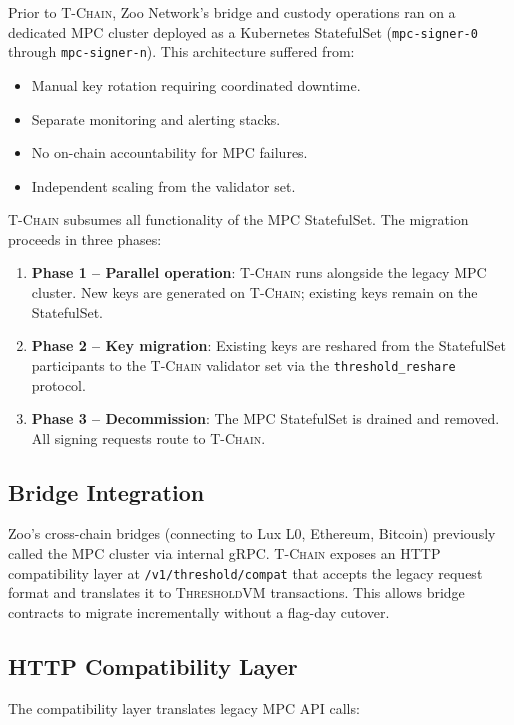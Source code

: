 \documentclass[11pt,letterpaper]{article}
\theoremstyle{definition}
\theoremstyle{remark}
\newcommand{\TChain}{\textsc{T-Chain}}
\newcommand{\ThresholdVM}{\textsc{ThresholdVM}}
\begin{document}
Prior to \TChain{}, Zoo Network's bridge and custody operations ran on a dedicated MPC cluster deployed as a Kubernetes StatefulSet (\texttt{mpc-signer-0} through \texttt{mpc-signer-n}). This architecture suffered from:

\begin{itemize}
\item Manual key rotation requiring coordinated downtime.
\item Separate monitoring and alerting stacks.
\item No on-chain accountability for MPC failures.
\item Independent scaling from the validator set.
\end{itemize}

\TChain{} subsumes all functionality of the MPC StatefulSet. The migration proceeds in three phases:

\begin{enumerate}
\item \textbf{Phase 1 -- Parallel operation}: \TChain{} runs alongside the legacy MPC cluster. New keys are generated on \TChain{}; existing keys remain on the StatefulSet.
\item \textbf{Phase 2 -- Key migration}: Existing keys are reshared from the StatefulSet participants to the \TChain{} validator set via the \texttt{threshold\_reshare} protocol.
\item \textbf{Phase 3 -- Decommission}: The MPC StatefulSet is drained and removed. All signing requests route to \TChain{}.
\end{enumerate}

\subsection{Bridge Integration}

Zoo's cross-chain bridges (connecting to Lux L0, Ethereum, Bitcoin) previously called the MPC cluster via internal gRPC. \TChain{} exposes an HTTP compatibility layer at \texttt{/v1/threshold/compat} that accepts the legacy request format and translates it to \ThresholdVM{} transactions. This allows bridge contracts to migrate incrementally without a flag-day cutover.

\subsection{HTTP Compatibility Layer}

The compatibility layer translates legacy MPC API calls:
\end{document}
